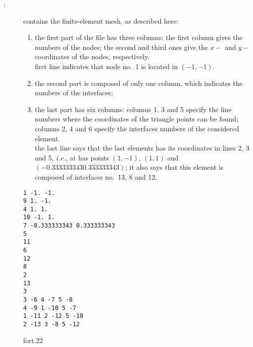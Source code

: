 \begin{description}

\item[:] contains the finite-element mesh, as described here:
\begin{enumerate}
\item the first part of the file has three columns: the first column gives the numbers of the nodes; the second and third ones give the $x-$ and $y-$coordinates of the nodes, respectively. \\
\example first line indicates that node no.~1 is located in $(-1,-1)$.
\item the second part is composed of only one column, which indicates the numbers of the interfaces;
\item the last part has six columns: columns 1, 3 and 5 specify the line numbers where the coordinates of the triangle points can be found; columns 2, 4 and 6 specify the interfaces numbers of the considered element.\\
\example the last line says that the last elements has its coordinates in lines 2, 3 and 5, \textit{i.e.}, at has points $(1,-1)$, $(1,1)$ and $(-0.333333343  0.333333343)$; it also says that this element is composed of interfaces no.~13, 8 and 12.
\end{enumerate}



\begin{exfile}[htpb]
\begin{footnotesize}
\texttt{1 -1. -1.\\
 9  1. -1.\\
 4  1.  1.\\
 10 -1.  1.\\
 7 -0.333333343  0.333333343\\
 5\\
 11\\
 6\\
 12\\
 8\\
 2\\
 13\\
 3\\
 3 -6 4 -7 5 -8\\
 4 -9 1 -10 5 -7\\
 1 -11 2 -12 5 -10\\
 2 -13 3 -8 5 -12
} 
\end{footnotesize}
\caption{fort.22\label{fig:fort22}}
\end{exfile}


\end{description}
